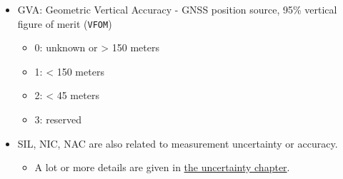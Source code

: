 \begin{itemize}

\item
  GVA: Geometric Vertical Accuracy - GNSS position source, 95\% vertical
  figure of merit (\texttt{VFOM})

  \begin{itemize}

  \item
    0: unknown or \textgreater{} 150 meters
  \item
    1: \textless{} 150 meters
  \item
    2: \textless{} 45 meters
  \item
    3: reserved
  \end{itemize}
\item
  SIL, NIC, NAC are also related to measurement uncertainty or accuracy.

  \begin{itemize}

  \item
    A lot or more details are given in \href{uncertainty.html}{the
    uncertainty chapter}.
  \end{itemize}
\end{itemize}
